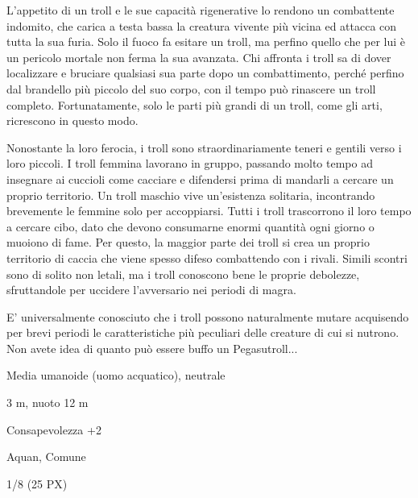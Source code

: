 \begin{multicols}{2}
{L'appetito di un troll e le sue capacità rigenerative lo rendono un combattente indomito, che carica a testa bassa la creatura vivente più vicina ed attacca con tutta la sua furia. Solo il fuoco fa esitare un troll, ma perfino quello che per lui è un pericolo mortale non ferma la sua avanzata. Chi affronta i troll sa di dover localizzare e bruciare qualsiasi sua parte dopo un combattimento, perché perfino dal brandello più piccolo del suo corpo, con il tempo può rinascere un troll completo. Fortunatamente, solo le parti più grandi di un troll, come gli arti, ricrescono in questo modo.

Nonostante la loro ferocia, i troll sono straordinariamente teneri e gentili verso i loro piccoli. I troll femmina lavorano in gruppo, passando molto tempo ad insegnare ai cuccioli come cacciare e difendersi prima di mandarli a cercare un proprio territorio. Un troll maschio vive un'esistenza solitaria, incontrando brevemente le femmine solo per accoppiarsi. Tutti i troll trascorrono il loro tempo a cercare cibo, dato che devono consumarne enormi quantità ogni giorno o muoiono di fame. Per questo, la maggior parte dei troll si crea un proprio territorio di caccia che viene spesso difeso combattendo con i rivali. Simili scontri sono di solito non letali, ma i troll conoscono bene le proprie debolezze, sfruttandole per uccidere l'avversario nei periodi di magra.

E' universalmente conosciuto che i troll possono naturalmente mutare acquisendo per brevi periodi le caratteristiche più peculiari delle creature di cui si nutrono. Non avete idea di quanto può essere buffo un Pegasutroll...


\begin{description}[noitemsep, topsep=0pt, parsep=0pt, partopsep=0pt, itemsep=1pt, leftmargin=2.35cm,  labelwidth=2.2cm, itemindent=0cm, listparindent=0pt] %
\setlength{\baselineskip}{10pt}
\item[\textbf{Taglia/Tipo}] Media umanoide (uomo acquatico), neutrale
\item[\textbf{Caratt.}] 
\item[\textbf{Punti Ferita}] 
\item[\textbf{Movimento}] 3 m, nuoto 12 m
\item[\textbf{Tiri Salvez.}] 
\item[\textbf{Comp.}] Consapevolezza +2
\item[\textbf{Linguaggi}] Aquan, Comune
\item[\textbf{Sfida}] 1/8 (25 PX)
\end{description}
\smallskip

}
\end{multicols}
